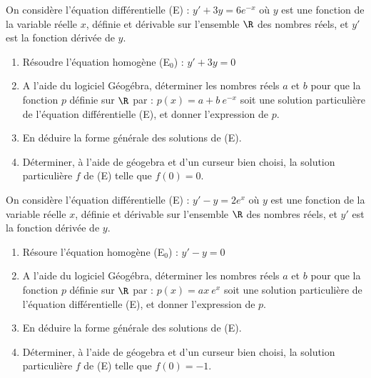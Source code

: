 \def\level{BTS}  %
\def\course{CIEL 2}
\def\chaptername{Equations différentielles} %
\def\docpart{Equations différentielles~--~TP Géogébra 1} %
\def\docname{C215}        %

\pagestyle{cours_FP}
\makeheaderBTS{} %


\begin{exercice_cours}[\quad]{}

On considère l’équation différentielle (E) : $y' + 3y = 6e^{-x}$ où $y$ est une fonction de la variable réelle $x$, définie et dérivable sur l’ensemble $\R$ des nombres réels, et $y'$ est la fonction dérivée de $y$.

\begin{enumerate}
	\item Résoudre l'équation homogène (E$_0$) : $y'+3y=0$  \hfill\reponseLigne[7cm]{}
	\item A l’aide du logiciel Géogébra, déterminer les nombres réels $a$ et $b$ pour que la fonction $p$ définie sur $\R$ par : $p(x) = a + b~e^{- x}$ soit une solution particulière de l'équation différentielle (E), et donner l’expression de $p$. \hfill\reponseLigne[7cm]{}
	\item En déduire la forme générale des solutions de (E).  \hfill\reponseLigne[7cm]{}
	\item Déterminer, à l'aide de géogebra et d'un curseur bien choisi, la solution particulière $f$ de (E) telle que $f(0)=0$.  \hfill\reponseLigne[7cm]{}   
\end{enumerate}
\end{exercice_cours}
\begin{exercice_cours}[\quad]{}

	On considère l’équation différentielle (E) : $y' - y = 2e^{x}$ où $y$ est une fonction de la variable réelle $x$, définie et dérivable sur l’ensemble $\R$ des nombres réels, et $y'$ est la fonction dérivée de $y$.

\begin{enumerate}
	\item Résoure l'équation homogène (E$_0$) : $y'-y=0$  \hfill\reponseLigne[7cm]{}
	\item A l’aide du logiciel Géogébra, déterminer les nombres réels $a$ et $b$ pour que la fonction $p$ définie sur $\R$ par : $p(x) = ax~e^{x}$ soit une solution particulière de l'équation différentielle (E), et donner l’expression de $p$. \hfill\reponseLigne[7cm]{}
	\item En déduire la forme générale des solutions de (E).  \hfill\reponseLigne[7cm]{}
	\item Déterminer, à l'aide de géogebra et d'un curseur bien choisi, la solution particulière $f$ de (E) telle que $f(0)=-1$.      \hfill\reponseLigne[7cm]{}
\end{enumerate}
\end{exercice_cours}

